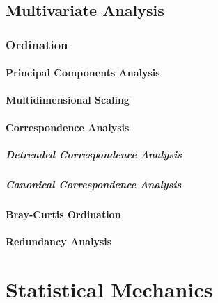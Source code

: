 \subsection{Multivariate Analysis}\label{sec:multivariate_analysis}

\subsubsection{Ordination}\label{sec:ordination}

\paragraph{Principal Components Analysis}
\label{sec:principal_components_analysis}\hfill

\paragraph{Multidimensional Scaling}\label{sec:multidimensional_scaling}\hfill

\paragraph{Correspondence Analysis}\label{sec:correspondence_analysis}\hfill

\subparagraph{Detrended Correspondence Analysis}
\label{sec:detrended_correspondence}\hfill

\subparagraph{Canonical Correspondence Analysis}
\label{sec:canonical_correspondence}\hfill



\paragraph{Bray-Curtis Ordination}\label{sec:bray_curtis_ordination}\hfill

\paragraph{Redundancy Analysis}\label{sec:redundancy_analysis}\hfill



\section{Statistical Mechanics}\label{sec:statistical_mechanics}

